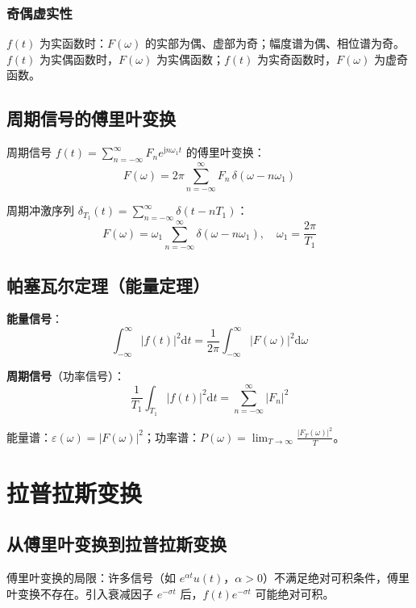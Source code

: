 \documentclass[11pt,a4paper]{ctexart}
\newcommand{\jj}{\mathrm{j}}            %
\newcommand{\dd}{\mathrm{d}}            %
\newcommand{\dirac}{\delta}             %
\begin{document}
\subsubsection{奇偶虚实性}
$f(t)$ 为实函数时：$F(\omega)$ 的实部为偶、虚部为奇；幅度谱为偶、相位谱为奇。$f(t)$ 为实偶函数时，$F(\omega)$ 为实偶函数；$f(t)$ 为实奇函数时，$F(\omega)$ 为虚奇函数。

\subsection{周期信号的傅里叶变换}

周期信号 $f(t) = \sum_{n=-\infty}^{\infty} F_n e^{\jj n\omega_1 t}$ 的傅里叶变换：
\[
\boxed{F(\omega) = 2\pi\sum_{n=-\infty}^{\infty} F_n\,\dirac(\omega - n\omega_1)}
\]

周期冲激序列 $\dirac_{T_1}(t) = \sum_{n=-\infty}^{\infty} \dirac(t - nT_1)$：
\[
F(\omega) = \omega_1\sum_{n=-\infty}^{\infty} \dirac(\omega - n\omega_1),\quad \omega_1 = \frac{2\pi}{T_1}
\]

\subsection{帕塞瓦尔定理（能量定理）}

\textbf{能量信号}：
\[
\boxed{\int_{-\infty}^{\infty} |f(t)|^2\dd t = \frac{1}{2\pi}\int_{-\infty}^{\infty} |F(\omega)|^2\dd\omega}
\]

\textbf{周期信号}（功率信号）：
\[
\frac{1}{T_1}\int_{T_1} |f(t)|^2\dd t = \sum_{n=-\infty}^{\infty} |F_n|^2
\]

能量谱：$\varepsilon(\omega) = |F(\omega)|^2$；功率谱：$P(\omega) = \lim_{T\to\infty} \frac{|F_T(\omega)|^2}{T}$。

\newpage
\section{拉普拉斯变换}

\subsection{从傅里叶变换到拉普拉斯变换}

傅里叶变换的局限：许多信号（如 $e^{\alpha t}u(t)$，$\alpha > 0$）不满足绝对可积条件，傅里叶变换不存在。引入衰减因子 $e^{-\sigma t}$ 后，$f(t)e^{-\sigma t}$ 可能绝对可积。
\end{document}
